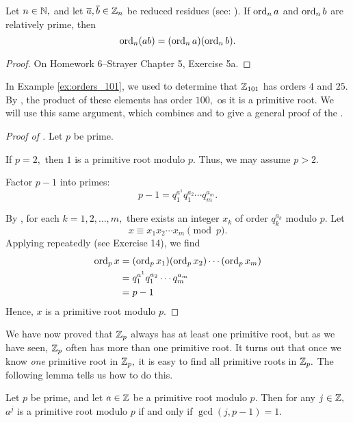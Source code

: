 \documentclass[letterpaper, 11 pt]{ximera}
\theoremstyle{definition}
\begin{document}
\begin{lem*}[Lemma 10.3.5]\label{read-lem:order-multiplicative}
    Let $n\in\mathbb N,$ and let $\overline{a},\overline{b}\in\mathbb Z_n$ be reduced residues (see: ). If $\operatorname{ord}_n a$ and $\operatorname{ord}_n b$ are relatively prime, then 
    \[\operatorname{ord}_n (ab)=(\operatorname{ord}_n a)(\operatorname{ord}_n b).\]
\end{lem*}

\begin{proof}
    On Homework 6--Strayer Chapter 5, Exercise 5a.
\end{proof}

In Example \ref{ex:orders_101}, we used  to determine that $\mathbb Z_{101}$ has orders $4$ and $25.$ By , the product of these elements has order $100,$ os it is a primitive root. We will use this same argument, which combines  and  to give a general proof of the .


\begin{proof}[Proof of ]
    Let $p$ be prime. 
    
    If $p=2,$ then $1$ is a primitive root modulo $p.$ Thus, we may assume $p>2.$

    Factor $p-1$ into primes:
    \[p-1=q_1^{a^1}q_1^{a_2}\cdots q_m^{a_m}.\]

    By , for each $k=1,2,\dots, m,$ there exists an integer ${x_k}$ of order $q_k^{a_k}$ modulo $p.$ Let 
    \[x\equiv x_1 x_2\cdots x_m\pmod{p}.\]
    Applying  repeatedly (see Exercise 14), we find 
    \begin{align*}
        \operatorname{ord}_p x &=(\operatorname{ord}_p x_1)(\operatorname{ord}_p x_2)\cdots(\operatorname{ord}_p x_m)\\
        &=q_1^{a^1}q_1^{a_2}\cdots q_m^{a_m}\\
        &=p-1
    \end{align*}
    Hence, $x$ is a primitive root modulo $p.$
\end{proof}

We have now proved that $\mathbb Z_p$ always has at least one primitive root, but as we have seen, $\mathbb Z_p$ often has more than one primitive root. It turns out that once we know \emph{one} primitive root in $\mathbb Z_p,$ it is easy to find all primitive roots in $\mathbb Z_p.$ The following lemma tells us how to do this.


\begin{lem*}[Lemma 10.3.6]\label{read-lem:all-prime-roots}
    Let $p$ be prime, and let $a\in\mathbb Z$ be a primitive root modulo $p.$ Then for any $j\in\mathbb Z,$ $a^j$ is a primitive root modulo $p$ if and only if $\gcd(j,p-1)=1.$
\end{lem*}
\end{document}
